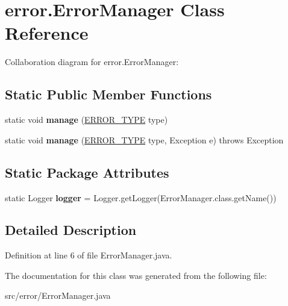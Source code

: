 \hypertarget{classerror_1_1_error_manager}{\section{error.\-Error\-Manager Class Reference}
\label{classerror_1_1_error_manager}
}


Collaboration diagram for error.\-Error\-Manager\-:
\subsection*{Static Public Member Functions}
\begin{DoxyCompactItemize}
\item 
\hypertarget{classerror_1_1_error_manager_a22faa52ee5734184fa446591fd45ba7f}{static void {\bfseries manage} (\hyperlink{enumerror_1_1_e_r_r_o_r___t_y_p_e}{E\-R\-R\-O\-R\-\_\-\-T\-Y\-P\-E} type)}\label{classerror_1_1_error_manager_a22faa52ee5734184fa446591fd45ba7f}

\item 
\hypertarget{classerror_1_1_error_manager_aa17e91fab94fd42d865e53eaec80e2cb}{static void {\bfseries manage} (\hyperlink{enumerror_1_1_e_r_r_o_r___t_y_p_e}{E\-R\-R\-O\-R\-\_\-\-T\-Y\-P\-E} type, Exception e)  throws Exception}\label{classerror_1_1_error_manager_aa17e91fab94fd42d865e53eaec80e2cb}

\end{DoxyCompactItemize}
\subsection*{Static Package Attributes}
\begin{DoxyCompactItemize}
\item 
\hypertarget{classerror_1_1_error_manager_abf11a50b38703340894a680bd8230144}{static Logger {\bfseries logger} = Logger.\-get\-Logger(Error\-Manager.\-class.\-get\-Name())}\label{classerror_1_1_error_manager_abf11a50b38703340894a680bd8230144}

\end{DoxyCompactItemize}


\subsection{Detailed Description}


Definition at line 6 of file Error\-Manager.\-java.



The documentation for this class was generated from the following file\-:\begin{DoxyCompactItemize}
\item 
src/error/Error\-Manager.\-java\end{DoxyCompactItemize}

